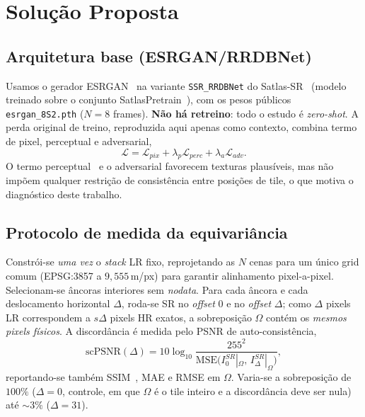 \documentclass[conference]{IEEEtran}
\begin{document}
\section{Solução Proposta}
\subsection{Arquitetura base (ESRGAN/RRDBNet)}
Usamos o gerador ESRGAN~\cite{b_esrgan} na variante \texttt{SSR\_RRDBNet} do
Satlas-SR~\cite{b_satlas_sr} (modelo treinado sobre o conjunto
SatlasPretrain~\cite{b_satlas}), com os pesos públicos \texttt{esrgan\_8S2.pth}
($N=8$ frames).
\textbf{Não há retreino}: todo o estudo é \emph{zero-shot}. A perda original de treino,
reproduzida aqui apenas como contexto, combina termo de pixel, perceptual e
adversarial,
\begin{equation}
\mathcal{L} = \mathcal{L}_{pix} + \lambda_p \mathcal{L}_{perc} + \lambda_a \mathcal{L}_{adv}.
\label{eq:loss}
\end{equation}
O termo perceptual~\cite{b_lpips} e o adversarial favorecem texturas plausíveis, mas
não impõem qualquer restrição de consistência entre posições de tile, o que motiva o
diagnóstico deste trabalho.

\subsection{Protocolo de medida da equivariância}
Constrói-se \emph{uma vez} o \textit{stack} LR fixo, reprojetando as $N$ cenas para um
único grid comum (EPSG:3857 a $9{,}555$\,m/px) para garantir alinhamento pixel-a-pixel.
Selecionam-se âncoras interiores sem \textit{nodata}. Para cada âncora e cada
deslocamento horizontal $\Delta$, roda-se SR no \textit{offset} $0$ e no \textit{offset}
$\Delta$; como $\Delta$ pixels LR correspondem a $s\Delta$ pixels HR exatos, a
sobreposição $\Omega$ contém os \emph{mesmos pixels físicos}. A discordância é medida
pelo PSNR de auto-consistência,
\begin{equation}
\text{scPSNR}(\Delta) = 10\log_{10}\!\frac{255^2}{\mathrm{MSE}\big(I^{SR}_0|_\Omega,\,I^{SR}_\Delta|_\Omega\big)},
\label{eq:scpsnr}
\end{equation}
reportando-se também SSIM~\cite{b_ssim}, MAE e RMSE em $\Omega$. Varia-se a sobreposição
de $100\%$ ($\Delta=0$, controle, em que $\Omega$ é o tile inteiro e a discordância deve
ser nula) até ${\sim}3\%$ ($\Delta=31$).
\end{document}
